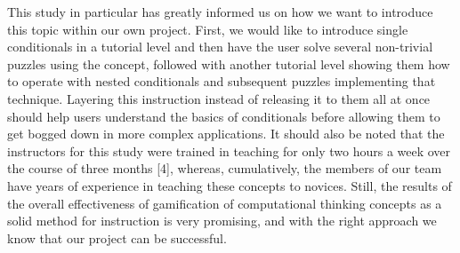 This study in particular has greatly informed us on how we want to introduce this topic within our 
own project. First, we would like to introduce single conditionals in a tutorial level 
and then have the user solve several non-trivial puzzles using the concept, followed with 
another tutorial level showing them how to operate with nested conditionals and 
subsequent puzzles implementing that technique. Layering this instruction instead of 
releasing it to them all at once should help users understand the basics of conditionals 
before allowing them to get bogged down in more complex applications. It should 
also be noted that the instructors for this study were trained in teaching for only 
two hours a week over the course of three months [4], whereas, cumulatively, the 
members of our team have years of experience in teaching these concepts to novices. 
Still, the results of the overall effectiveness of gamification of computational thinking 
concepts as a solid method for instruction is very promising, and with the right approach 
we know that our project can be successful.\\